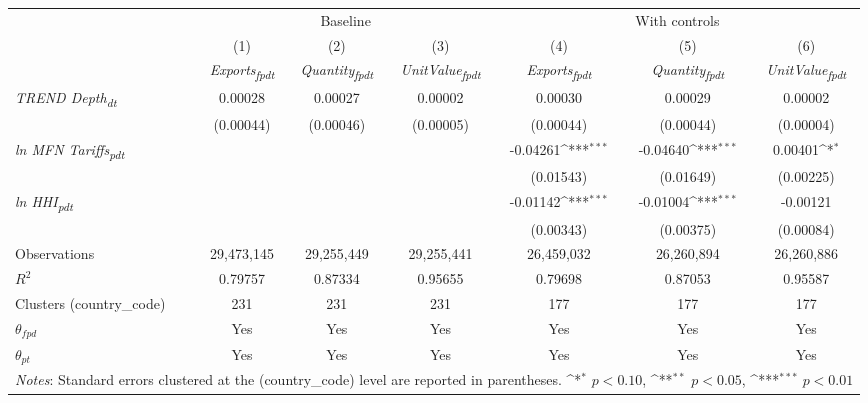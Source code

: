 {
\def\sym#1{\ifmmode^{#1}\else\(^{#1}\)\fi}
\begin{tabular}{l*{6}{c}}
\toprule
&\multicolumn{3}{c}{Baseline}&\multicolumn{3}{c}{With controls}\\\cmidrule(lr){2-4}\cmidrule(lr){5-7}
&(1)&(2)&(3)&(4)&(5)&(6)\\
&\textit{Exports\textsubscript{fpdt}}&\textit{Quantity\textsubscript{fpdt}}&\textit{UnitValue\textsubscript{fpdt}}&\textit{Exports\textsubscript{fpdt}}&\textit{Quantity\textsubscript{fpdt}}&\textit{UnitValue\textsubscript{fpdt}}\\
\midrule
\textit{TREND Depth\textsubscript{dt}} & 0.00028 & 0.00027 & 0.00002 & 0.00030 & 0.00029 & 0.00002\\
 & (0.00044) & (0.00046) & (0.00005) & (0.00044) & (0.00044) & (0.00004)\\
\addlinespace
\textit{ln MFN Tariffs\textsubscript{pdt}} &  &  &  & -0.04261\sym{***} & -0.04640\sym{***} & 0.00401\sym{*}\\
 &  &  &  & (0.01543) & (0.01649) & (0.00225)\\
\addlinespace
\textit{ln HHI\textsubscript{pdt}} &  &  &  & -0.01142\sym{***} & -0.01004\sym{***} & -0.00121\\
 &  &  &  & (0.00343) & (0.00375) & (0.00084)\\
\midrule
Observations & 29,473,145 & 29,255,449 & 29,255,441 & 26,459,032 & 26,260,894 & 26,260,886\\
$R^{2}$ & 0.79757 & 0.87334 & 0.95655 & 0.79698 & 0.87053 & 0.95587\\
Clusters (country_code) & 231 & 231 & 231 & 177 & 177 & 177\\
$\theta_{fpd}$ & Yes & Yes & Yes & Yes & Yes & Yes\\
$\theta_{pt}$ & Yes & Yes & Yes & Yes & Yes & Yes\\
\bottomrule
\multicolumn{7}{l}{\footnotesize \textit{Notes}: Standard errors clustered at the (country_code) level are reported in parentheses. \sym{*} \(p<0.10\), \sym{**} \(p<0.05\), \sym{***} \(p<0.01\)}\\
\end{tabular}
}
